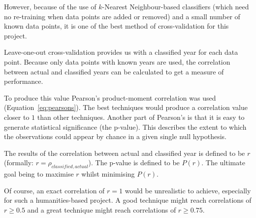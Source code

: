 However, because of the use of $k$-Nearest Neighbour-based classifiers (which need no re-training 
when data points are added or removed) and a small number of known data points, it is one of the best 
method of cross-validation for this project.

Leave-one-out cross-validation provides us with a classified year for each data point. Because
only data points with known years are used, the correlation between actual and
classified years can be calculated to get a measure of performance.

To produce this value Pearson's product-moment correlation was used (Equation~\ref{eq:pearsons}).
The best techniques would produce a correlation value closer to $1$ than other techniques. Another
part of Pearson's is that it is easy to generate statistical significance (the p-value). This
describes the extent to which the observations could appear by chance in a given single null
hypothesis.

The results of the correlation between actual and classified year is defined to be $r$ 
(formally: $r=\rho_{classified, actual}$). The p-value is defined to be $P(r)$. The ultimate goal 
being to maximise $r$ whilst minimising $P(r)$.

Of course, an exact correlation of $r=1$ would be unrealistic to achieve, especially for such a 
humanities-based project. A good technique might reach correlations of $r \ge 0.5$ and a great
technique might reach correlations of $r \ge 0.75$.



